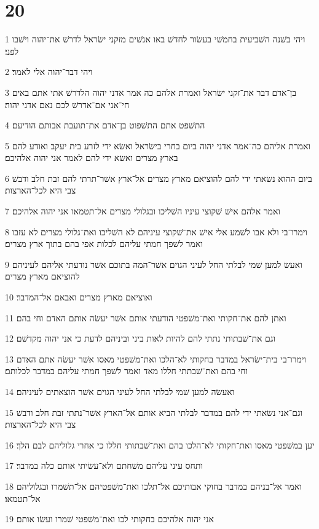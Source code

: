 \chapter{20}

\par 1 ויהי בשׁנה השׁביעית בחמשׁי בעשׂור לחדשׁ באו אנשׁים מזקני ישׂראל לדרשׁ את־יהוה וישׁבו לפני׃
\par 2 ויהי דבר־יהוה אלי לאמר׃
\par 3 בן־אדם דבר את־זקני ישׂראל ואמרת אלהם כה אמר אדני יהוה הלדרשׁ אתי אתם באים חי־אני אם־אדרשׁ לכם נאם אדני יהוה׃
\par 4 התשׁפט אתם התשׁפוט בן־אדם את־תועבת אבותם הודיעם׃
\par 5 ואמרת אליהם כה־אמר אדני יהוה ביום בחרי בישׂראל ואשׂא ידי לזרע בית יעקב ואודע להם בארץ מצרים ואשׂא ידי להם לאמר אני יהוה אלהיכם׃
\par 6 ביום ההוא נשׂאתי ידי להם להוציאם מארץ מצרים אל־ארץ אשׁר־תרתי להם זבת חלב ודבשׁ צבי היא לכל־הארצות׃
\par 7 ואמר אלהם אישׁ שׁקוצי עיניו השׁליכו ובגלולי מצרים אל־תטמאו אני יהוה אלהיכם׃
\par 8 וימרו־בי ולא אבו לשׁמע אלי אישׁ את־שׁקוצי עיניהם לא השׁליכו ואת־גלולי מצרים לא עזבו ואמר לשׁפך חמתי עליהם לכלות אפי בהם בתוך ארץ מצרים׃
\par 9 ואעשׂ למען שׁמי לבלתי החל לעיני הגוים אשׁר־המה בתוכם אשׁר נודעתי אליהם לעיניהם להוציאם מארץ מצרים׃
\par 10 ואוציאם מארץ מצרים ואבאם אל־המדבר׃
\par 11 ואתן להם את־חקותי ואת־משׁפטי הודעתי אותם אשׁר יעשׂה אותם האדם וחי בהם׃
\par 12 וגם את־שׁבתותי נתתי להם להיות לאות ביני וביניהם לדעת כי אני יהוה מקדשׁם׃
\par 13 וימרו־בי בית־ישׂראל במדבר בחקותי לא־הלכו ואת־משׁפטי מאסו אשׁר יעשׂה אתם האדם וחי בהם ואת־שׁבתתי חללו מאד ואמר לשׁפך חמתי עליהם במדבר לכלותם׃
\par 14 ואעשׂה למען שׁמי לבלתי החל לעיני הגוים אשׁר הוצאתים לעיניהם׃
\par 15 וגם־אני נשׂאתי ידי להם במדבר לבלתי הביא אותם אל־הארץ אשׁר־נתתי זבת חלב ודבשׁ צבי היא לכל־הארצות׃
\par 16 יען במשׁפטי מאסו ואת־חקותי לא־הלכו בהם ואת־שׁבתותי חללו כי אחרי גלוליהם לבם הלך׃
\par 17 ותחס עיני עליהם משׁחתם ולא־עשׂיתי אותם כלה במדבר׃
\par 18 ואמר אל־בניהם במדבר בחוקי אבותיכם אל־תלכו ואת־משׁפטיהם אל־תשׁמרו ובגלוליהם אל־תטמאו׃
\par 19 אני יהוה אלהיכם בחקותי לכו ואת־משׁפטי שׁמרו ועשׂו אותם׃
